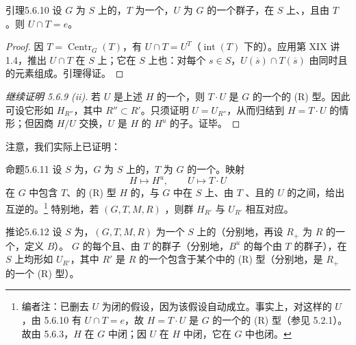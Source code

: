 \begin{SGAresult}{引理}{5.6.10}
设 $G$ 为 $S$ 上的，$T$ 为一个，$U$ 为 $G$ 的一个群子，在 $S$ 上、，且由 $T$ 。则 $U\cap T=e$。
\end{SGAresult}
\begin{proof}
因 $T=\operatorname{Centr}_G(T)$，有 $U\cap T=U^T$（$\operatorname{int}(T)$ 下的）。应用第 XIX 讲 1.4，推出 $U\cap T$ 在 $S$ 上；它在 $S$ 上也：对每个 $s\in S$，$U(\overline s)\cap T(\overline s)$ 由同时且的元素组成。引理得证。
\end{proof}
\begin{proof}[继续证明 5.6.9 (ii)]
若 $U$ 是上述 $H$ 的一个，则 $T\cdot U$ 是 $G$ 的一个的 (R) 型。因此可设它形如 $H_{R''}$，其中 $R''\subset R'$。只须证明 $U=U_{R''}$，从而归结到 $H=T\cdot U$ 的情形；但因商 $H/U$ 交换，$U$ 是 $H$ 的 $H^u$ 的子。证毕。
\end{proof}
注意，我们实际上已证明：
\begin{SGAresult}{命题}{5.6.11}
设 $S$ 为，$G$ 为 $S$ 上的，$T$ 为 $G$ 的一个。映射
\[H\longmapsto H^u,\qquad U\longmapsto T\cdot U\]
在 $G$ 中包含 $T$、的 (R) 型 $H$ 的，与 $G$ 中在 $S$ 上、由 $T$ 、且的 $U$ 的之间，给出互逆的。\footnote{编者注：已删去 $U$ 为闭的假设，因为该假设自动成立。事实上，对这样的 $U$，由 5.6.10 有 $U\cap T=e$，故 $H=T\cdot U$ 是 $G$ 的一个的 (R) 型（参见 5.2.1）。故由 5.6.3，$H$ 在 $G$ 中闭；因 $U$ 在 $H$ 中闭，它在 $G$ 中也闭。}
特别地，若 $(G,T,M,R)$ ，则群 $H_{R'}$ 与 $U_{R'}$ 相互对应。
\end{SGAresult}
\begin{SGAresult}{推论}{5.6.12}
设 $S$ 为，$(G,T,M,R)$ 为一个 $S$ 上的（分别地，再设 $R_+$ 为 $R$ 的一个，定义 $B$）。
$G$ 的每个且、由 $T$ 的群子（分别地，$B^u$ 的每个由 $T$ 的群子），在 $S$ 上均形如 $U_{R'}$，其中 $R'$ 是 $R$ 的一个包含于某个中的 (R) 型（分别地，是 $R_+$ 的一个 (R) 型）。
\end{SGAresult}
